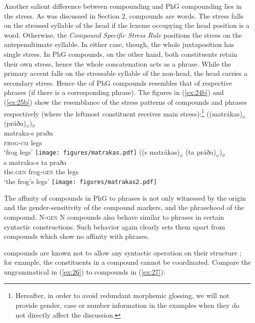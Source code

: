 \documentclass[output=paper]{LSP/langsci}
\begin{document}
Another salient difference between  compounding and PhG compounding lies in the stress. As was discussed in Section 2,  compounds are  words. The stress falls on the stressed syllable of the head if the lexeme occupying the head position is a word. Otherwise, the \textit{Compound Specific Stress Rule} positions the stress on the antepenultimate syllable. In either case, though, the whole juxtaposition has single stress. In PhG compounds, on the other hand, both constituents retain their own stress, hence the whole concatenation acts as a  phrase. While the primary accent falls on the stressable syllable of the non-head, the head carries a secondary stress. Hence the  of PhG compounds resembles that of respective  phrases (if there is a corresponding  phrase). The figures in (\ref{ex:24b}) and (\ref{ex:25b}) show the resemblance of the stress patterns of compounds and  phrases respectively (where the leftmost constituent receives main stress):\footnote{Hereafter, in order to avoid redundant morphemic glossing, we will not provide gender, case or number information in the examples when they do not directly affect the discussion.} 
\ea\label{ex:24}
	\ea\label{ex:24a}
		\glll ((matrákas)$_{\omega}$ (práða)$_{\omega}$)$_{\phi}$ \\
				matraka-s praða\\
				\textsc{frog-cm} legs\\
		\glt `frog legs'
	\ex\label{ex:24b}
 \texttt{[image: figures/matrakas.pdf]}
	\z
\z
\ea\label{ex:25}
	\ea\label{ex:25a}
		\glll  ((s matrákas)$_{\omega}$ (ta práða)$_{\omega}$)$_{\phi}$ \\
				s matraka-s ta praða\\
				the.\textsc{gen} frog-\textsc{gen} the legs\\
		\glt `the frog's legs'
	\ex\label{ex:25b}
\texttt{[image: figures/matrakas2.pdf]}
	\z
\z

The affinity of compounds in PhG to  phrases is not only witnessed by the origin and the gender-sensitivity of the compound markers, and the  phrasehood of the compound. N-\textsc{gen} N compounds also behave similar to  phrases in certain syntactic constructions. Such behavior again clearly sets them apart from  compounds which show no affinity with phrases.

 compounds are known not to allow any syntactic operation on their structure \citep{Ralli2007,Ralli2013moderngreek}; for example, the constituents in a  compound cannot be coordinated. Compare the ungrammatical  in (\ref{ex:26}) to  compounds in (\ref{ex:27}):  
\end{document}

